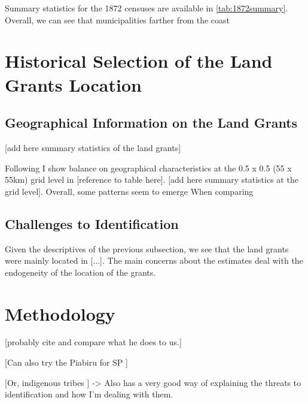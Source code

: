 \documentclass{article}
\begin{document}
Summary statistics for the 1872 censuses are available in \autoref{tab:1872summary}. Overall, we can see that municipalities farther from the coast 

\section{Historical Selection of the Land Grants Location}

\subsection{Geographical Information on the Land Grants}

[add here summary statistics of the land grants]

Following \textcite{Lowes2021-ww} I show balance on geographical characteristics at the 0.5 x 0.5 (55 x 55km) grid level in [reference to table here]. [add here summary statistics at the grid level]. 
Overall, some patterns seem to emerge 
When comparing 

\subsection{Challenges to Identification}

Given the descriptives of the previous subsection, we see that the land grants were mainly located in [...]. The main concerns about the estimates deal with the endogeneity of the location of the grants. 

\section{Methodology}

[probably cite \parencite{Rocha2017-yq} and compare what he does to us.]

[Can also try the Piabiru for SP \parencite{Barsanetti2021-hp}]

[Or, indigenous tribes \parencite{Barsanetti2023-xq}] -> Also has a very good way of explaining the threats to identification and how I'm dealing with them.




\end{document}
